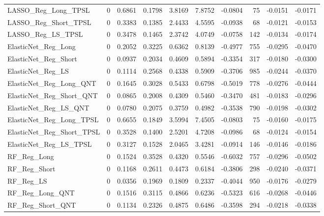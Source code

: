 \begin{tabular}{llrrrrrrrr}
\cline{1-10}
LASSO\_Reg\_Long\_TPSL & 0 & 0.6861 & 0.1798 & 3.8169 & 7.8752 & -0.0804 & 75 & -0.0151 & -0.0171 \\
\cline{1-10}
LASSO\_Reg\_Short\_TPSL & 0 & 0.3383 & 0.1385 & 2.4433 & 4.5595 & -0.0938 & 68 & -0.0121 & -0.0153 \\
\cline{1-10}
LASSO\_Reg\_LS\_TPSL & 0 & 0.3478 & 0.1465 & 2.3742 & 4.0749 & -0.0758 & 142 & -0.0134 & -0.0174 \\
\cline{1-10}
ElasticNet\_Reg\_Long & 0 & 0.2052 & 0.3225 & 0.6362 & 0.8139 & -0.4977 & 755 & -0.0295 & -0.0470 \\
\cline{1-10}
ElasticNet\_Reg\_Short & 0 & 0.0937 & 0.2034 & 0.4609 & 0.5894 & -0.3354 & 317 & -0.0180 & -0.0300 \\
\cline{1-10}
ElasticNet\_Reg\_LS & 0 & 0.1114 & 0.2568 & 0.4338 & 0.5909 & -0.3706 & 985 & -0.0244 & -0.0370 \\
\cline{1-10}
ElasticNet\_Reg\_Long\_QNT & 0 & 0.1645 & 0.3028 & 0.5433 & 0.6798 & -0.5019 & 778 & -0.0276 & -0.0444 \\
\cline{1-10}
ElasticNet\_Reg\_Short\_QNT & 0 & 0.0865 & 0.2008 & 0.4309 & 0.5460 & -0.3470 & 481 & -0.0183 & -0.0296 \\
\cline{1-10}
ElasticNet\_Reg\_LS\_QNT & 0 & 0.0780 & 0.2075 & 0.3759 & 0.4982 & -0.3538 & 790 & -0.0198 & -0.0302 \\
\cline{1-10}
ElasticNet\_Reg\_Long\_TPSL & 0 & 0.6655 & 0.1849 & 3.5994 & 7.4505 & -0.0803 & 75 & -0.0160 & -0.0175 \\
\cline{1-10}
ElasticNet\_Reg\_Short\_TPSL & 0 & 0.3528 & 0.1400 & 2.5201 & 4.7208 & -0.0986 & 68 & -0.0124 & -0.0154 \\
\cline{1-10}
ElasticNet\_Reg\_LS\_TPSL & 0 & 0.3127 & 0.1528 & 2.0465 & 3.4281 & -0.0914 & 146 & -0.0146 & -0.0186 \\
\cline{1-10}
RF\_Reg\_Long & 0 & 0.1524 & 0.3528 & 0.4320 & 0.5546 & -0.6032 & 757 & -0.0296 & -0.0502 \\
\cline{1-10}
RF\_Reg\_Short & 0 & 0.1168 & 0.2611 & 0.4473 & 0.6184 & -0.3806 & 298 & -0.0240 & -0.0371 \\
\cline{1-10}
RF\_Reg\_LS & 0 & 0.0356 & 0.1969 & 0.1809 & 0.2337 & -0.4044 & 950 & -0.0176 & -0.0279 \\
\cline{1-10}
RF\_Reg\_Long\_QNT & 0 & 0.1516 & 0.3115 & 0.4866 & 0.6236 & -0.5323 & 616 & -0.0268 & -0.0446 \\
\cline{1-10}
RF\_Reg\_Short\_QNT & 0 & 0.1134 & 0.2326 & 0.4875 & 0.6486 & -0.3598 & 294 & -0.0218 & -0.0338 \\

\end{tabular}
